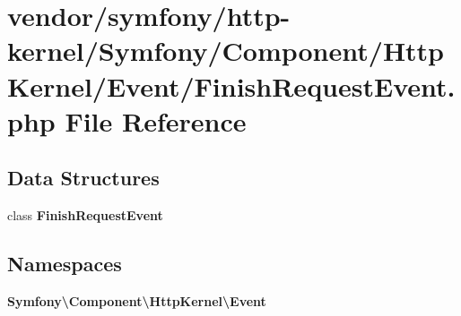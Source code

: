 \section{vendor/symfony/http-\/kernel/\+Symfony/\+Component/\+Http\+Kernel/\+Event/\+Finish\+Request\+Event.php File Reference}
\label{_finish_request_event_8php}
\subsection*{Data Structures}
\begin{DoxyCompactItemize}
\item 
class {\bf Finish\+Request\+Event}
\end{DoxyCompactItemize}
\subsection*{Namespaces}
\begin{DoxyCompactItemize}
\item 
 {\bf Symfony\textbackslash{}\+Component\textbackslash{}\+Http\+Kernel\textbackslash{}\+Event}
\end{DoxyCompactItemize}
